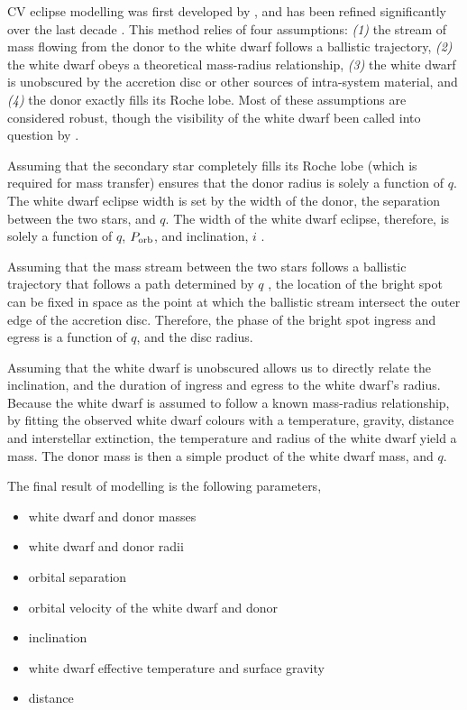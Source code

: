 CV eclipse modelling was first developed by \citet{wood1986}, and has been refined significantly over the last decade \citep{Savoury2011, McAllister2017, McAllister2019}. This method relies of four assumptions: \textit{(1)} the stream of mass flowing from the donor to the white dwarf follows a ballistic trajectory, \textit{(2)} the white dwarf obeys a theoretical mass-radius relationship, \textit{(3)} the white dwarf is unobscured by the accretion disc or other sources of intra-system material, and \textit{(4)} the donor exactly fills its Roche lobe. Most of these assumptions are considered robust, though the visibility of the white dwarf been called into question by \citet{Spark2015}.

Assuming that the secondary star completely fills its Roche lobe (which is required for mass transfer) ensures that the donor radius is solely a function of $q$. The white dwarf eclipse width is set by the width of the donor, the separation between the two stars, and $q$. The width of the white dwarf eclipse, therefore, is solely a function of $q$, $P_{\rm orb}$, and inclination, $i$ \citep{bailey1979}.

Assuming that the mass stream between the two stars follows a ballistic trajectory that follows a path determined by $q$ \citep{Lubow1975}, the location of the bright spot can be fixed in space as the point at which the ballistic stream intersect the outer edge of the accretion disc. Therefore, the phase of the bright spot ingress and egress is a function of $q$, and the disc radius.

Assuming that the white dwarf is unobscured allows us to directly relate the inclination, and the duration of ingress and egress to the white dwarf's radius. Because the white dwarf is assumed to follow a known mass-radius relationship, by fitting the observed white dwarf colours with a temperature, gravity, distance and interstellar extinction, the temperature and radius of the white dwarf yield a mass. The donor mass is then a simple product of the white dwarf mass, and $q$.

The final result of modelling is the following parameters,
\begin{itemize}
    \item white dwarf and donor masses
    \item white dwarf and donor radii
    \item orbital separation
    \item orbital velocity of the white dwarf and donor
    \item inclination
    \item white dwarf effective temperature and surface gravity
    \item distance
\end{itemize}

